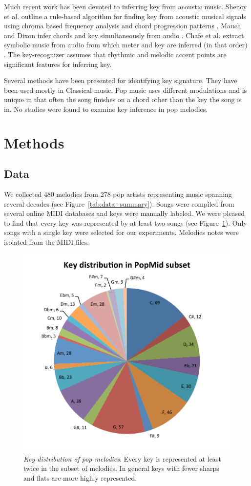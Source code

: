 \documentclass[letterpaper]{article}
\begin{document}
Much recent work has been devoted to inferring key from acoustic music. Shenoy et al. outline a rule-based algorithm for finding key from acoustic musical signals using chroma based frequency analysis and chord progression patterns \cite{shenoy2004key}. Mauch and Dixon infer chords and key simultaneously from audio \cite{mauch2010simultaneous}. Chafe et al. extract symbolic music from audio from which meter and key are inferred (in that order) \cite{chafe1982toward}. The key-recognizer assumes that rhythmic and melodic accent points are significant features for inferring key.

Several methods have been presented for identifying key signature. They have been used mostly in Classical music. Pop music uses different modulations and is unique in that often the song finishes on a chord other than the key the song is in. No studies were found to examine key inference in pop melodies.

\section{Methods}

\subsection{Data}

We collected 480 melodies from 278 pop artists representing music spanning several decades (see Figure~\ref{tab:data_summary}). Songs were compiled from several online MIDI databases and keys were manually labeled. We were pleased to find that every key was represented by at least two songs (see Figure~\ref{fig:key_distribution}). Only songs with a single key were selected for our experiments. Melodies notes were isolated from the MIDI files. 


\begin{figure}
  \centering
 \includegraphics[width=.4\textwidth]{./key_distribution.pdf}
  \caption{\emph{Key distribution of pop melodies}. Every key is represented at least twice in the subset of melodies. In general keys with fewer sharps and flats are more highly represented.}
  \label{fig:key_distribution}
\end{figure}
\end{document}
